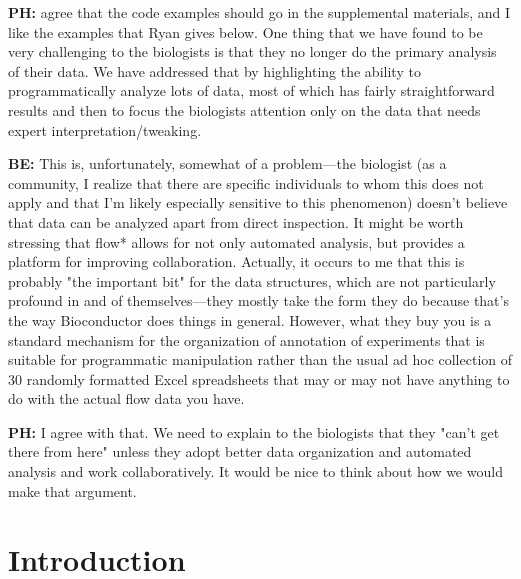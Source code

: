 \documentclass[12pt]{article}
\begin{document}
{\bf PH:} agree that the code examples should go in the supplemental
materials, and I like the examples that Ryan gives below. One thing
that we have found to be very challenging to the biologists is that
they no longer do the primary analysis of their data. We have
addressed that by highlighting the ability to programmatically analyze
lots of data, most of which has fairly straightforward results and
then to focus the biologists attention only on the data that needs
expert interpretation/tweaking.

{\bf BE:} This is, unfortunately, somewhat of a problem---the biologist (as
a community, I realize that there are specific individuals to whom
this does not apply and that I'm likely especially sensitive to this
phenomenon) doesn't believe that data can be analyzed apart from
direct inspection. It might be worth stressing that flow* allows for
not only automated analysis, but provides a platform for improving
collaboration. Actually, it occurs to me that this is probably "the
important bit" for the data structures, which are not particularly
profound in and of themselves---they mostly take the form they do
because that's the way Bioconductor does things in general. However,
what they buy you is a standard mechanism for the organization of
annotation of experiments that is suitable for programmatic
manipulation rather than the usual ad hoc collection of 30 randomly
formatted Excel spreadsheets that may or may not have anything to do
with the actual flow data you have.

{\bf PH:} I agree with that. We need to explain to the biologists that they
"can't get there from here" unless they adopt better data organization
and automated analysis and work collaboratively. It would be nice to
think about how we would make that argument.

\bigskip











\maketitle

\section*{Introduction}
\end{document}
